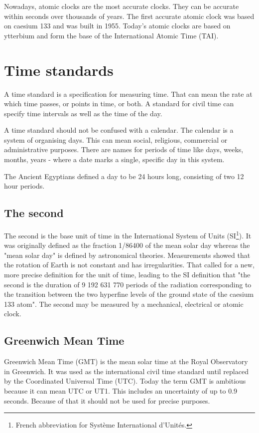 Nowadays, atomic clocks are the most accurate clocks. They can be accurate within seconds over thousands of years. The first accurate atomic clock was based on caesium 133 and was built in 1955. Today's atomic clocks are based on ytterbium and form the base of the International Atomic Time (TAI).

\section{Time standards}

A time standard is a specification for measuring time. That can mean the rate at which time passes, or points in time, or both. A standard for civil time can specify time intervals as well as the time of the day.

A time standard should not be confused with a calendar. The calendar is a system of organising days. This can mean social, religious, commercial or administrative purposes. There are names for periods of time like days, weeks, months, years - where a date marks a single, specific day in this system.

The Ancient Egyptians defined a day to be 24 hours long, consisting of two 12 hour periods.

\subsection{The second}

The second is the base unit of time in the International System of Units (SI\footnote{French abbreviation for Système International d'Unités.}).\cite{second_merriam} It was originally defined as the fraction 1/86400 of the mean solar day whereas the "mean solar day" is defined by astronomical theories. Measurements showed that the rotation of Earth is not constant and has irregularities. That called for a new, more precise definition for the unit of time, leading to the SI definition that "the second is the duration of 9 192 631 770 periods of the radiation corresponding to the transition between the two hyperfine levels of the ground state of the caesium 133 atom".\cite{second_nist}
The second may be measured by a mechanical, electrical or atomic clock.

\subsection{Greenwich Mean Time}

Greenwich Mean Time (GMT) is the mean solar time at the Royal Observatory in Greenwich.\cite{gmt} It was used as the international civil time standard until replaced by the Coordinated Universal Time (UTC). Today the term GMT is ambitious because it can mean UTC or UT1. This includes an uncertainty of up to 0.9 seconds. Because of that it should not be used for precise purposes.

